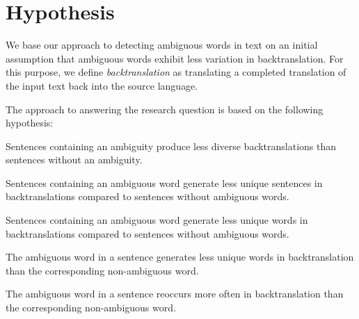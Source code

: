 \section{Hypothesis}
\label{sec:Methodology:Hypothesis}
We base our approach to detecting ambiguous words in text on an initial assumption that ambiguous words exhibit less variation in backtranslation.  For this purpose, we define \textit{backtranslation} as translating a completed translation of the input text back into the source language.  

The approach to answering the research question is based on the following hypothesis:

\begin{hyp}[H]\label{main}
Sentences containing an ambiguity produce less diverse backtranslations than sentences without an ambiguity.
\end{hyp}



\begin{subhyp}[a]\label{a}
Sentences containing an ambiguous word generate less unique sentences in backtranslations compared to sentences without ambiguous words.
\end{subhyp}

\begin{subhyp}[b]\label{b}
Sentences containing an ambiguous word generate less unique words in backtranslations compared to sentences without ambiguous words.
\end{subhyp}

\begin{subhyp}[c]\label{c}
The ambiguous word in a sentence generates less unique words in backtranslation than the corresponding non-ambiguous word.
\end{subhyp}

\begin{subhyp}[d]\label{d}
The ambiguous word in a sentence reoccurs more often in backtranslation than the corresponding non-ambiguous word.
\end{subhyp}


